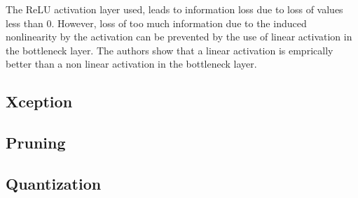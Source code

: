 The ReLU activation layer used, leads to information loss due to loss of values less than 0. However, loss of too much information due to the induced nonlinearity by the activation can be prevented by the use of linear activation in the bottleneck layer. The authors show that a linear activation is emprically better than a non linear activation in the bottleneck layer.

\subsection{Xception}

\subsection{Pruning}

\subsection{Quantization}
